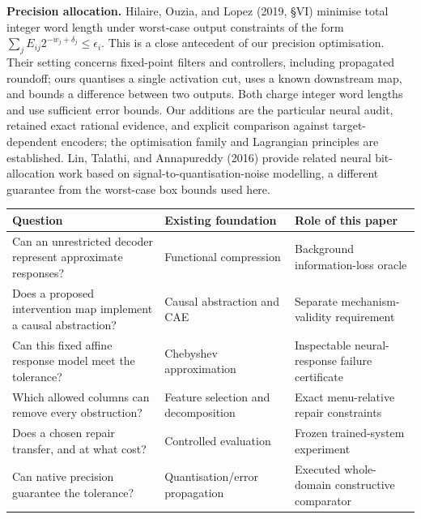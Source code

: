 \documentclass[
  british,
  11pt,
  a4paper,
]{article}
\newcounter{none} %
\begin{document}
\textbf{Precision allocation.} Hilaire, Ouzia, and Lopez (2019, §VI)
minimise total integer word length under worst-case output constraints
of the form \(\sum_j E_{ij}2^{-w_j+\delta_j}\le\epsilon_i\). This is a
close antecedent of our precision optimisation. Their setting concerns
fixed-point filters and controllers, including propagated roundoff; ours
quantises a single activation cut, uses a known downstream map, and
bounds a difference between two outputs. Both charge integer word
lengths and use sufficient error bounds. Our additions are the
particular neural audit, retained exact rational evidence, and explicit
comparison against target-dependent encoders; the optimisation family
and Lagrangian principles are established. Lin, Talathi, and Annapureddy
(2016) provide related neural bit-allocation work based on
signal-to-quantisation-noise modelling, a different guarantee from the
worst-case box bounds used here.

{\def\LTcaptype{none} %
\begin{longtable}[]{@{}
  >{\raggedright\arraybackslash}p{}
  >{\raggedright\arraybackslash}p{}
  >{\raggedright\arraybackslash}p{}@{}}
\toprule\noalign{}
\begin{minipage}[b]{\linewidth}\raggedright
Question
\end{minipage} & \begin{minipage}[b]{\linewidth}\raggedright
Existing foundation
\end{minipage} & \begin{minipage}[b]{\linewidth}\raggedright
Role of this paper
\end{minipage} \\
\midrule\noalign{}
\endhead
\bottomrule\noalign{}
\endlastfoot
Can an unrestricted decoder represent approximate responses? &
Functional compression & Background information-loss oracle \\
Does a proposed intervention map implement a causal abstraction? &
Causal abstraction and CAE & Separate mechanism-validity requirement \\
Can this fixed affine response model meet the tolerance? & Chebyshev
approximation & Inspectable neural-response failure certificate \\
Which allowed columns can remove every obstruction? & Feature selection
and decomposition & Exact menu-relative repair constraints \\
Does a chosen repair transfer, and at what cost? & Controlled evaluation
& Frozen trained-system experiment \\
Can native precision guarantee the tolerance? & Quantisation/error
propagation & Executed whole-domain constructive comparator \\
\end{longtable}
}
\end{document}

